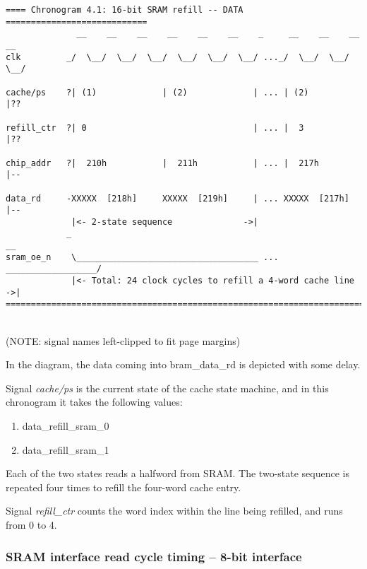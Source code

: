 \begin{verbatim}
==== Chronogram 4.1: 16-bit SRAM refill -- DATA ============================
              __    __    __    __    __    __    _     __    __    __    __
clk         _/  \__/  \__/  \__/  \__/  \__/  \__/ ..._/  \__/  \__/  \__/ 

cache/ps    ?| (1)             | (2)             | ... | (2)             |??

refill_ctr  ?| 0                                 | ... |  3              |??

chip_addr   ?|  210h           |  211h           | ... |  217h           |--

data_rd     -XXXXX  [218h]     XXXXX  [219h]     | ... XXXXX  [217h]     |-- 
             |<- 2-state sequence              ->| 
            _                                                             __
sram_oe_n    \____________________________________ ... __________________/  
             |<- Total: 24 clock cycles to refill a 4-word cache line  ->|  
============================================================================
\end{verbatim}\\

(NOTE: signal names left-clipped to fit page margins)

In the diagram, the data coming into bram\_data\_rd is depicted with some delay.

Signal \emph{cache/ps} is the current state of the cache state machine, and
in this chronogram it takes the following values:

\begin{enumerate}
\item data\_refill\_sram\_0
\item data\_refill\_sram\_1
\end{enumerate}

Each of the two states reads a halfword from SRAM. The two-state sequence is 
repeated four times to refill the four-word cache entry.

Signal \emph{refill\_ctr} counts the word index within the line being refilled,
and runs from 0 to 4.\\


\subsubsection{SRAM interface read cycle timing -- 8-bit interface}
\label{sram_read_cycle_8b}

